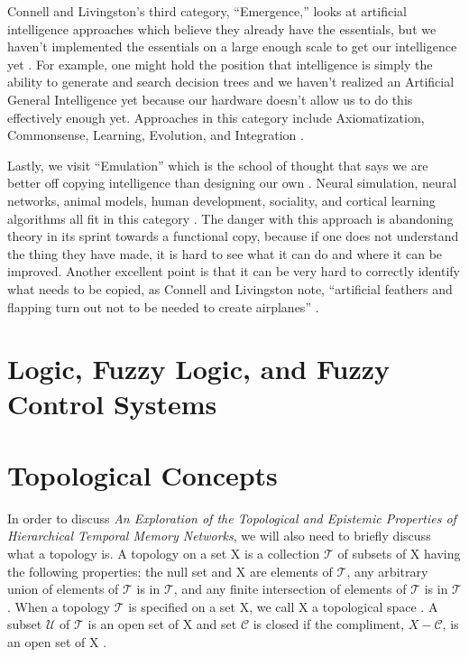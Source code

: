 \documentclass[fleqn,notitlepage,minimal]{article}
\begin{document}
	Connell and Livingston's third category, ``Emergence,'' looks at artificial intelligence approaches which believe they already have the essentials, but we haven't implemented the essentials on a large enough scale to get our intelligence yet \cite{Connell}. For example, one might hold the position that intelligence is simply the ability to generate and search decision trees and we haven't realized an Artificial General Intelligence yet because our hardware doesn't allow us to do this effectively enough yet. Approaches in this category include Axiomatization, Commonsense, Learning, Evolution, and Integration \cite{Connell}.
	
	Lastly, we visit ``Emulation'' which is the school of thought that says we are better off copying intelligence than designing our own \cite{Connell}. Neural simulation, neural networks, animal models, human development, sociality, and cortical learning algorithms all fit in this category \cite{Connell}. The danger with this approach is abandoning theory in its sprint towards a functional copy, because if one does not understand the thing they have made, it is hard to see what it can do and where it can be improved. Another excellent point is that it can be very hard to correctly identify what needs to be copied, as Connell and Livingston note, ``artificial feathers and flapping turn out not to be needed to create airplanes'' \cite{Connell}.
	
	\section{Logic, Fuzzy Logic, and Fuzzy Control Systems}
	
	\section{Topological Concepts}
	
	In order to discuss \textit{An Exploration of the Topological and Epistemic Properties of Hierarchical Temporal Memory Networks}, we will also need to briefly discuss what a topology is. A topology on a set X is a collection $\mathcal{T}$ of subsets of X having the following properties: the null set and X are elements of $\mathcal{T}$, any arbitrary union of elements of $\mathcal{T}$ is in $\mathcal{T}$, and any finite intersection of elements of $\mathcal{T}$ is in $\mathcal{T}$ \cite{Munkres}. When a topology $\mathcal{T}$ is specified on a set X, we call X a topological space \cite{Munkres}. A subset $\mathcal{U}$ of $\mathcal{T}$ is an open set of X and set $\mathcal{C}$ is closed if the compliment, $X-\mathcal{C}$, is an open set of X \cite{Adams}.
	
\end{document}
